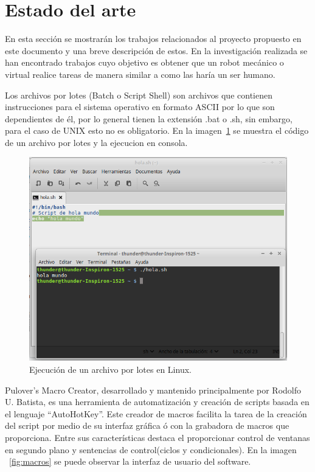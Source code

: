 
\section{Estado del arte}
En esta sección se mostrarán los trabajos relacionados al proyecto propuesto
 en este documento y una breve descripción de estos. En la investigación
 realizada se han encontrado trabajos cuyo objetivo es obtener que un robot
 mecánico o virtual realice tareas de manera similar a como las haría un
 ser humano. 


Los archivos por lotes (Batch o Script Shell) \cite{Silberschatz1999} son
 archivos que contienen instrucciones para el sistema operativo en formato
 ASCII por lo que son dependientes de él, por lo general tienen la extensión
 .bat o .sh, sin embargo, para el caso de UNIX esto no es obligatorio. En la
 imagen~\ref{fig:script} se muestra el código de un archivo por lotes y la 
 ejecucion en consola.


\begin{figure}[H]
\centering
\includegraphics[width=0.7\columnwidth]{CapituloI/Imagenes/Script.png}
\caption{Ejecución de un archivo por lotes en Linux.}
\label{fig:script}
\end{figure}


Pulover's Macro Creator\cite{Batista}, desarrollado y mantenido
 principalmente por Rodolfo U. Batista, es una herramienta de automatización
 y creación de scripts basada en el lenguaje ``AutoHotKey''. Este  creador de
 macros facilita la tarea de la creación del script por medio de  su interfaz
 gráfica ó con la grabadora de macros que proporciona. Entre sus
 características destaca el proporcionar control de ventanas en segundo plano
 y sentencias de control(ciclos y condicionales). En la imagen
 ~\ref{fig:macros} se puede observar la interfaz de usuario del software.


